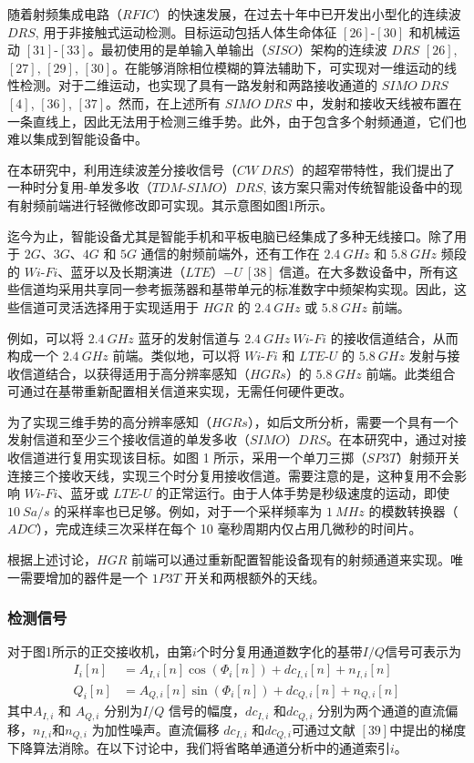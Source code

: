 \begin{TranslationNoMiniToc}
随着射频集成电路（$RFIC$）的快速发展，在过去十年中已开发出小型化的连续波 $DRS$, 用于非接触式运动检测。目标运动包括人体生命体征 $[26]$-$[30]$ 和机械运动 $[31]$-$[33]$。最初使用的是单输入单输出（$SISO$）架构的连续波 $DRS$ $[26]$, $[27]$, $[29]$, $[30]$。在能够消除相位模糊的算法辅助下，可实现对一维运动的线性检测。对于二维运动，也实现了具有一路发射和两路接收通道的 $SIMO \ DRS$ $[4]$, $[36]$, $[37]$。然而，在上述所有 $SIMO \ DRS$ 中，发射和接收天线被布置在一条直线上，因此无法用于检测三维手势。此外，由于包含多个射频通道，它们也难以集成到智能设备中。

在本研究中，利用连续波差分接收信号（$CW \ DRS$）的超窄带特性，我们提出了一种时分复用-单发多收（$TDM$-$SIMO$）$DRS$, 该方案只需对传统智能设备中的现有射频前端进行轻微修改即可实现。其示意图如图1所示。

迄今为止，智能设备尤其是智能手机和平板电脑已经集成了多种无线接口。除了用于 $2G$、$3G$、$4G$ 和 $5G$ 通信的射频前端外，还有工作在 $2.4 \ GHz$ 和 $5.8 \ GHz$ 频段的 $Wi$-$Fi$、蓝牙以及长期演进（$LTE$）$-U \ [38]$ 信道。在大多数设备中，所有这些信道均采用共享同一参考振荡器和基带单元的标准数字中频架构实现。因此，这些信道可灵活选择用于实现适用于 $HGR$ 的 $2.4 \ GHz$ 或 $5.8 \ GHz$ 前端。

例如，可以将 $2.4 \ GHz$ 蓝牙的发射信道与 $2.4 \ GHz \ Wi$-$Fi$ 的接收信道结合，从而构成一个 $2.4 \ GHz$ 前端。类似地，可以将 $Wi$-$Fi$ 和 $LTE$-$U$ 的 $5.8 \ GHz$ 发射与接收信道结合，以获得适用于高分辨率感知（$HGRs$）的 $5.8 \ GHz$ 前端。此类组合可通过在基带重新配置相关信道来实现，无需任何硬件更改。

为了实现三维手势的高分辨率感知（$HGRs$），如后文所分析，需要一个具有一个发射信道和至少三个接收信道的单发多收（$SIMO$）$DRS$。在本研究中，通过对接收信道进行复用实现该目标。如图 1 所示，采用一个单刀三掷（$SP3T$）射频开关连接三个接收天线，实现三个时分复用接收信道。需要注意的是，这种复用不会影响 $Wi$-$Fi$、蓝牙或 $LTE$-$U$ 的正常运行。由于人体手势是秒级速度的运动，即使 $10 \ Sa/s$ 的采样率也已足够。例如，对于一个采样频率为 $1 \ MHz$ 的模数转换器（$ADC$），完成连续三次采样在每个 10 毫秒周期内仅占用几微秒的时间片。

根据上述讨论，$HGR$ 前端可以通过重新配置智能设备现有的射频通道来实现。唯一需要增加的器件是一个 $1P3T$ 开关和两根额外的天线。

\subsubsection{检测信号}
对于图1所示的正交接收机，由第$i$个时分复用通道数字化的基带$I/Q$信号可表示为
\begin{equation}
\begin{aligned}
I_i[n] &= A_{I,i}[n] \cos(\Phi_i[n]) + dc_{I,i}[n] + n_{I,i}[n] \\
Q_i[n] &= A_{Q,i}[n] \sin(\Phi_i[n]) + dc_{Q,i}[n] + n_{Q,i}[n]
\end{aligned}
\end{equation}
其中$A_{I,i}$ 和 $A_{Q,i}$ 分别为$I/Q$ 信号的幅度，$dc_{I,i}$ 和$dc_{Q,i}$ 分别为两个通道的直流偏移，$n_{I,i}$和$n_{Q,i}$ 为加性噪声。直流偏移 $dc_{I,i}$ 和$dc_{Q,i}$可通过文献 $[39]$中提出的梯度下降算法消除。在以下讨论中，我们将省略单通道分析中的通道索引$i$。


\end{TranslationNoMiniToc}
